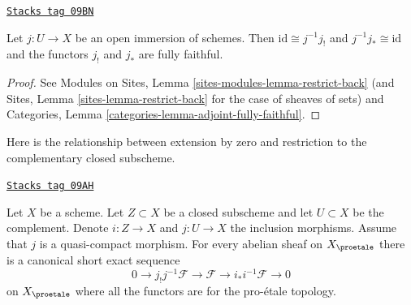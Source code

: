 \begin{lemma}
\label{proetale-lemma-open-immersion}
\href{https://stacks.math.columbia.edu/tag/09BN}{\texttt{Stacks tag 09BN}}

Let $j : U \to X$ be an open immersion of schemes.
Then $\text{id} \cong j^{-1}j_!$ and $j^{-1}j_* \cong \text{id}$
and the functors $j_!$ and $j_*$ are fully faithful.
\end{lemma}

\begin{proof}
See Modules on Sites, Lemma \ref{sites-modules-lemma-restrict-back}
(and Sites, Lemma \ref{sites-lemma-restrict-back} for the case
of sheaves of sets) and
Categories, Lemma \ref{categories-lemma-adjoint-fully-faithful}.
\end{proof}

Here is the relationship between extension by zero and restriction
to the complementary closed subscheme.

\begin{lemma}
\label{proetale-lemma-ses-associated-to-open}
\href{https://stacks.math.columbia.edu/tag/09AH}{\texttt{Stacks tag 09AH}}

Let $X$ be a scheme. Let $Z \subset X$ be a closed subscheme and let
$U \subset X$ be the complement. Denote $i : Z \to X$ and $j : U \to X$
the inclusion morphisms. Assume that $j$ is a quasi-compact morphism.
For every abelian sheaf on $X_\proetale$ there is a canonical short exact
sequence
$$
0 \to j_!j^{-1}\mathcal{F} \to \mathcal{F} \to i_*i^{-1}\mathcal{F} \to 0
$$
on $X_\proetale$ where all the functors are for the pro-\'etale topology.
\end{lemma}

